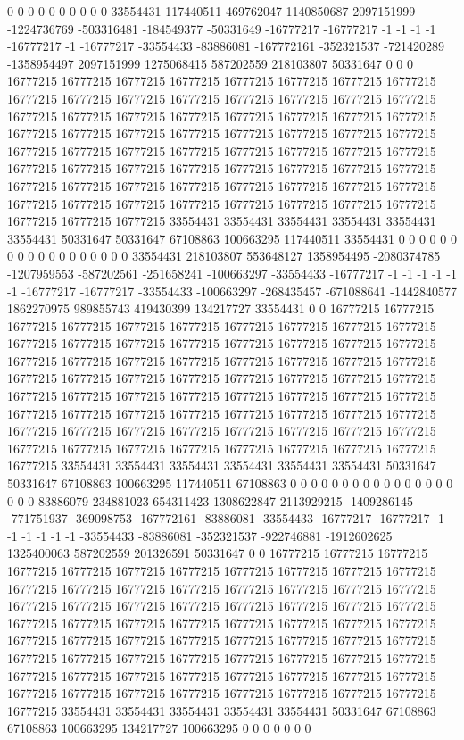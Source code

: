 0 0 0 0 0 0 0 0 0 0 33554431 117440511 469762047 1140850687 2097151999 -1224736769 -503316481 -184549377 -50331649 -16777217 -16777217 -1 -1 -1 -1 -16777217 -1 -16777217 -33554433 -83886081 -167772161 -352321537 -721420289 -1358954497 2097151999 1275068415 587202559 218103807 50331647 0 0 0 16777215 16777215 16777215 16777215 16777215 16777215 16777215 16777215 16777215 16777215 16777215 16777215 16777215 16777215 16777215 16777215 16777215 16777215 16777215 16777215 16777215 16777215 16777215 16777215 16777215 16777215 16777215 16777215 16777215 16777215 16777215 16777215 16777215 16777215 16777215 16777215 16777215 16777215 16777215 16777215 16777215 16777215 16777215 16777215 16777215 16777215 16777215 16777215 16777215 16777215 16777215 16777215 16777215 16777215 16777215 16777215 16777215 16777215 16777215 16777215 16777215 16777215 16777215 16777215 16777215 16777215 16777215 33554431 33554431 33554431 33554431 33554431 33554431 50331647 50331647 67108863 100663295 117440511 33554431 0 0 0 0 0 0 0
0 0 0 0 0 0 0 0 0 0 0 33554431 218103807 553648127 1358954495 -2080374785 -1207959553 -587202561 -251658241 -100663297 -33554433 -16777217 -1 -1 -1 -1 -1 -1 -16777217 -16777217 -33554433 -100663297 -268435457 -671088641 -1442840577 1862270975 989855743 419430399 134217727 33554431 0 0 16777215 16777215 16777215 16777215 16777215 16777215 16777215 16777215 16777215 16777215 16777215 16777215 16777215 16777215 16777215 16777215 16777215 16777215 16777215 16777215 16777215 16777215 16777215 16777215 16777215 16777215 16777215 16777215 16777215 16777215 16777215 16777215 16777215 16777215 16777215 16777215 16777215 16777215 16777215 16777215 16777215 16777215 16777215 16777215 16777215 16777215 16777215 16777215 16777215 16777215 16777215 16777215 16777215 16777215 16777215 16777215 16777215 16777215 16777215 16777215 16777215 16777215 16777215 16777215 16777215 16777215 16777215 33554431 33554431 33554431 33554431 33554431 33554431 50331647 50331647 67108863 100663295 117440511 67108863 0 0 0 0 0 0 0
0 0 0 0 0 0 0 0 0 0 0 0 83886079 234881023 654311423 1308622847 2113929215 -1409286145 -771751937 -369098753 -167772161 -83886081 -33554433 -16777217 -16777217 -1 -1 -1 -1 -1 -1 -33554433 -83886081 -352321537 -922746881 -1912602625 1325400063 587202559 201326591 50331647 0 0 16777215 16777215 16777215 16777215 16777215 16777215 16777215 16777215 16777215 16777215 16777215 16777215 16777215 16777215 16777215 16777215 16777215 16777215 16777215 16777215 16777215 16777215 16777215 16777215 16777215 16777215 16777215 16777215 16777215 16777215 16777215 16777215 16777215 16777215 16777215 16777215 16777215 16777215 16777215 16777215 16777215 16777215 16777215 16777215 16777215 16777215 16777215 16777215 16777215 16777215 16777215 16777215 16777215 16777215 16777215 16777215 16777215 16777215 16777215 16777215 16777215 16777215 16777215 16777215 16777215 16777215 16777215 16777215 33554431 33554431 33554431 33554431 33554431 50331647 67108863 67108863 100663295 134217727 100663295 0 0 0 0 0 0 0
